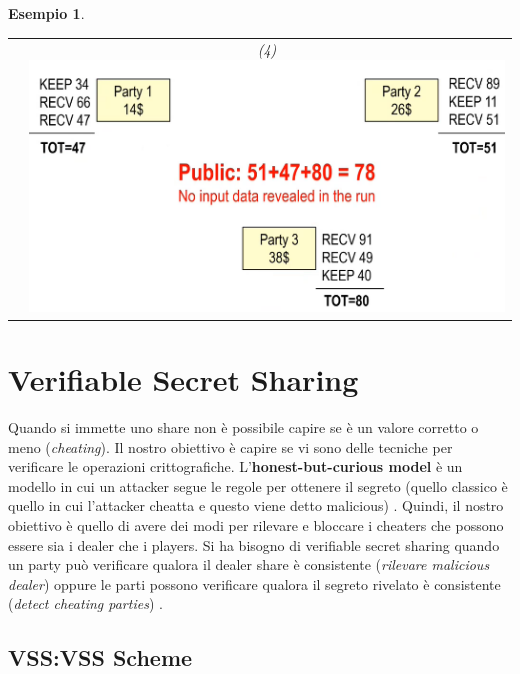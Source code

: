 \documentclass{book}
\newtheorem{esempio}{\textcolor{Grey1}{Esempio}}
\begin{document}
\begin{esempio}
\begin{tabular}{c c}
		 &
		(4)\includegraphics[scale=0.5]{2021-12-29-23-47-08.png}%
		\\
	\end{tabular}
\end{esempio}
\chapter{Verifiable Secret Sharing}
Quando si immette uno share non è possibile capire se è un valore corretto o meno (\emph{cheating})\@. Il nostro obiettivo è capire se vi sono delle tecniche per verificare le operazioni crittografiche\@.\newline
L'\textbf{honest-but-curious model} è un modello in cui un attacker segue le regole per ottenere il segreto (quello classico è quello in cui l'attacker cheatta e questo viene detto malicious) \@. Quindi, il nostro obiettivo è quello di avere dei modi per rilevare e bloccare i cheaters che possono essere sia i dealer che i players\@.\newline
Si ha bisogno di verifiable secret sharing quando un party può verificare qualora il dealer share è consistente (\emph{rilevare malicious dealer}) oppure le parti possono verificare qualora il segreto rivelato è consistente (\emph{detect cheating parties}) \@.
\section{VSS:\@Feldman VSS Scheme}
\end{document}
